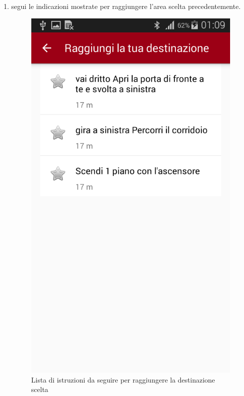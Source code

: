 \documentclass[../ClipsManualeUtente.tex]{subfiles}
\begin{document}
\begin{enumerate}
		\item segui le indicazioni mostrate per raggiungere l'area scelta precedentemente.
		
		\begin{figure} [h]
			\centering
			\includegraphics[scale=0.2]{img/ListaIstruzioni}
			\caption{Lista di istruzioni da seguire per raggiungere la destinazione scelta}
			\label{fig:ListaIstruzioni}
		\end{figure}	
		
	\end{enumerate}
\end{document}
